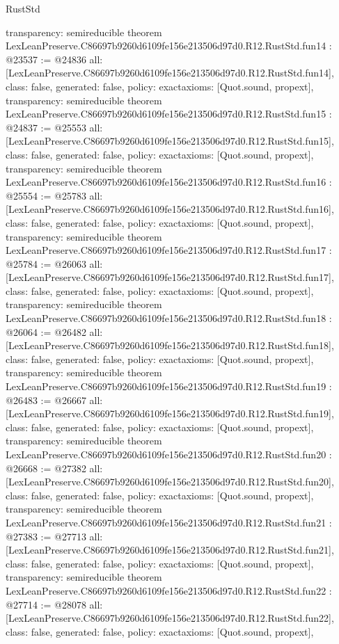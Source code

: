 \begin{lexlean}{RustStd}
\begin{coremodule}
{  transparency: semireducible
}
theorem LexLeanPreserve.C86697b9260d6109fe156e213506d97d0.R12.RustStd.fun14 : @23537 := @24836 {
  all: [LexLeanPreserve.C86697b9260d6109fe156e213506d97d0.R12.RustStd.fun14],
  class: false,
  generated: false,
  policy: exact{axioms: [Quot.sound, propext]},
  transparency: semireducible
}
theorem LexLeanPreserve.C86697b9260d6109fe156e213506d97d0.R12.RustStd.fun15 : @24837 := @25553 {
  all: [LexLeanPreserve.C86697b9260d6109fe156e213506d97d0.R12.RustStd.fun15],
  class: false,
  generated: false,
  policy: exact{axioms: [Quot.sound, propext]},
  transparency: semireducible
}
theorem LexLeanPreserve.C86697b9260d6109fe156e213506d97d0.R12.RustStd.fun16 : @25554 := @25783 {
  all: [LexLeanPreserve.C86697b9260d6109fe156e213506d97d0.R12.RustStd.fun16],
  class: false,
  generated: false,
  policy: exact{axioms: [Quot.sound, propext]},
  transparency: semireducible
}
theorem LexLeanPreserve.C86697b9260d6109fe156e213506d97d0.R12.RustStd.fun17 : @25784 := @26063 {
  all: [LexLeanPreserve.C86697b9260d6109fe156e213506d97d0.R12.RustStd.fun17],
  class: false,
  generated: false,
  policy: exact{axioms: [Quot.sound, propext]},
  transparency: semireducible
}
theorem LexLeanPreserve.C86697b9260d6109fe156e213506d97d0.R12.RustStd.fun18 : @26064 := @26482 {
  all: [LexLeanPreserve.C86697b9260d6109fe156e213506d97d0.R12.RustStd.fun18],
  class: false,
  generated: false,
  policy: exact{axioms: [Quot.sound, propext]},
  transparency: semireducible
}
theorem LexLeanPreserve.C86697b9260d6109fe156e213506d97d0.R12.RustStd.fun19 : @26483 := @26667 {
  all: [LexLeanPreserve.C86697b9260d6109fe156e213506d97d0.R12.RustStd.fun19],
  class: false,
  generated: false,
  policy: exact{axioms: [Quot.sound, propext]},
  transparency: semireducible
}
theorem LexLeanPreserve.C86697b9260d6109fe156e213506d97d0.R12.RustStd.fun20 : @26668 := @27382 {
  all: [LexLeanPreserve.C86697b9260d6109fe156e213506d97d0.R12.RustStd.fun20],
  class: false,
  generated: false,
  policy: exact{axioms: [Quot.sound, propext]},
  transparency: semireducible
}
theorem LexLeanPreserve.C86697b9260d6109fe156e213506d97d0.R12.RustStd.fun21 : @27383 := @27713 {
  all: [LexLeanPreserve.C86697b9260d6109fe156e213506d97d0.R12.RustStd.fun21],
  class: false,
  generated: false,
  policy: exact{axioms: [Quot.sound, propext]},
  transparency: semireducible
}
theorem LexLeanPreserve.C86697b9260d6109fe156e213506d97d0.R12.RustStd.fun22 : @27714 := @28078 {
  all: [LexLeanPreserve.C86697b9260d6109fe156e213506d97d0.R12.RustStd.fun22],
  class: false,
  generated: false,
  policy: exact{axioms: [Quot.sound, propext]},
}
\end{coremodule}
\end{lexlean}
